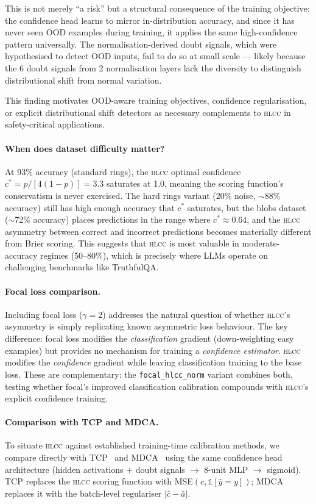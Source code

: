 \documentclass[11pt,a4paper]{article}
\newcommand{\hlcc}{\textsc{hlcc}}
\newcommand{\cstar}{c^{*}}
\begin{document}
This is not merely ``a risk'' but a structural consequence of the
training objective: the confidence head learns to mirror in-distribution
accuracy, and since it has never seen OOD examples during training,
it applies the same high-confidence pattern universally.  The
normalisation-derived doubt signals, which were hypothesised to
detect OOD inputs, fail to do so at small scale --- likely because
the 6 doubt signals from 2 normalisation layers lack the diversity
to distinguish distributional shift from normal variation.

This finding motivates OOD-aware training objectives, confidence
regularisation, or explicit distributional shift detectors as
necessary complements to \hlcc{} in safety-critical applications.

\paragraph{When does dataset difficulty matter?}
At 93\% accuracy (standard rings), the \hlcc{} optimal confidence
$\cstar = p/[4(1-p)] = 3.3$ saturates at 1.0, meaning the scoring
function's conservatism is never exercised.  The hard rings variant
(20\% noise, $\sim$88\% accuracy) still has high enough accuracy that
$\cstar$ saturates, but the blobs dataset ($\sim$72\% accuracy) places
predictions in the range where $\cstar \approx 0.64$, and the \hlcc{}
asymmetry between correct and incorrect predictions becomes materially
different from Brier scoring.  This suggests that \hlcc{} is most
valuable in moderate-accuracy regimes (50--80\%), which is precisely
where LLMs operate on challenging benchmarks like TruthfulQA.

\paragraph{Focal loss comparison.}
Including focal loss ($\gamma = 2$) addresses the natural question of
whether \hlcc{}'s asymmetry is simply replicating known asymmetric
loss behaviour.  The key difference: focal loss modifies the
\emph{classification} gradient (down-weighting easy examples) but
provides no mechanism for training a \emph{confidence estimator}.
\hlcc{} modifies the \emph{confidence} gradient while leaving
classification training to the base loss.  These are complementary:
the \texttt{focal\_hlcc\_norm} variant combines both, testing whether
focal's improved classification calibration compounds with \hlcc{}'s
explicit confidence training.

\paragraph{Comparison with TCP and MDCA.}
To situate \hlcc{} against established training-time calibration
methods, we compare directly with TCP~\cite{corbiere2019addressing}
and MDCA~\cite{hebbalaguppe2022stitch} using the same confidence head
architecture (hidden activations + doubt signals $\to$ 8-unit MLP
$\to$ sigmoid).  TCP replaces the \hlcc{} scoring function with
MSE$(c, \mathbb{1}[\hat{y}=y])$; MDCA replaces it with the batch-level
regulariser $|\bar{c} - \bar{a}|$.
\end{document}

